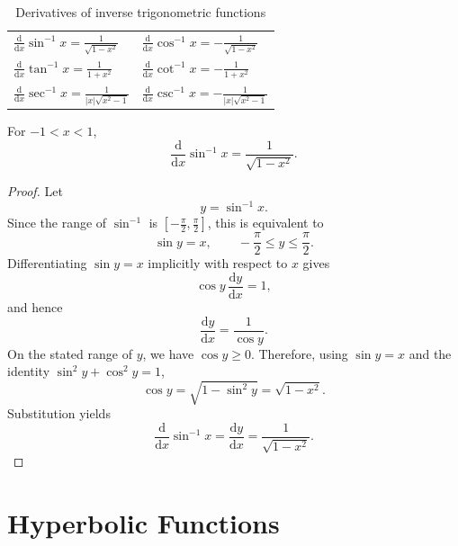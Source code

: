 \begin{table}[H]
    \centering
    \begin{tabular}{ll}
        \toprule
        \(\displaystyle \frac{\mathrm{d}}{\mathrm{d}x}\sin^{-1}x
            =\frac{1}{\sqrt{1-x^2}}\)
        & \(\displaystyle \frac{\mathrm{d}}{\mathrm{d}x}\cos^{-1}x
            =-\frac{1}{\sqrt{1-x^2}}\) \\
        \(\displaystyle \frac{\mathrm{d}}{\mathrm{d}x}\tan^{-1}x
            =\frac{1}{1+x^2}\)
        & \(\displaystyle \frac{\mathrm{d}}{\mathrm{d}x}\cot^{-1}x
            =-\frac{1}{1+x^2}\) \\
        \(\displaystyle \frac{\mathrm{d}}{\mathrm{d}x}\sec^{-1}x
            =\frac{1}{\lvert x\rvert\sqrt{x^2-1}}\)
        & \(\displaystyle \frac{\mathrm{d}}{\mathrm{d}x}\csc^{-1}x
            =-\frac{1}{\lvert x\rvert\sqrt{x^2-1}}\) \\
        \bottomrule
    \end{tabular}
    \caption{Derivatives of inverse trigonometric functions}
    \label{tab:derivatives-of-inverse-trig}
\end{table}

\begin{theorem}
    For \(-1<x<1\),
    \[
        \frac{\mathrm{d}}{\mathrm{d}x}\sin^{-1}x
        =\frac{1}{\sqrt{1-x^2}}.
    \]
\end{theorem}
\begin{proof}
    Let
    \[
        y=\sin^{-1}x.
    \]
    Since the range of \(\sin^{-1}\) is
    \(\left[-\frac{\pi}{2},\frac{\pi}{2}\right]\), this is equivalent to
    \[
        \sin y=x,
        \qquad
        -\frac{\pi}{2}\leq y\leq\frac{\pi}{2}.
    \]
    Differentiating \(\sin y=x\) implicitly with respect to \(x\) gives
    \[
        \cos y\,\frac{\mathrm{d}y}{\mathrm{d}x}=1,
    \]
    and hence
    \[
        \frac{\mathrm{d}y}{\mathrm{d}x}=\frac{1}{\cos y}.
    \]
    On the stated range of \(y\), we have \(\cos y\geq0\).  Therefore,
    using \(\sin y=x\) and the identity
    \(\sin^2y+\cos^2y=1\),
    \[
        \cos y
        =\sqrt{1-\sin^2y}
        =\sqrt{1-x^2}.
    \]
    Substitution yields
    \[
        \frac{\mathrm{d}}{\mathrm{d}x}\sin^{-1}x
        =\frac{\mathrm{d}y}{\mathrm{d}x}
        =\frac{1}{\sqrt{1-x^2}}.
    \]
\end{proof}

\section{Hyperbolic Functions}

